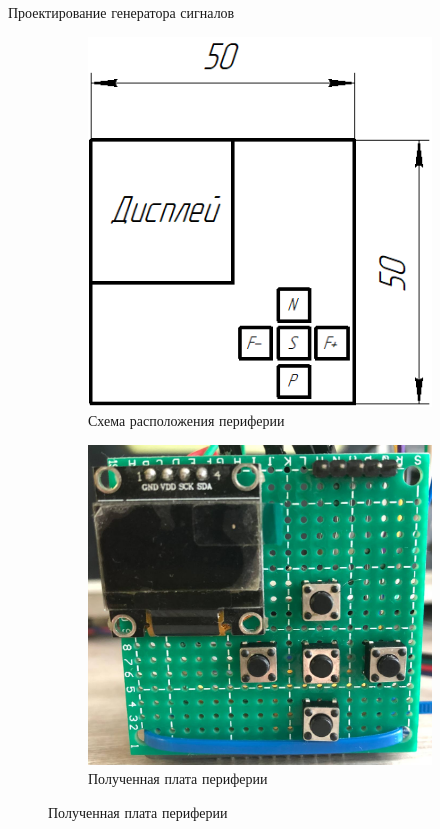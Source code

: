 \documentclass[10pt]{beamer}
\begin{document}
\begin{frame}{Проектирование генератора сигналов}
\begin{figure}
     \begin{subfigure}[H]{0.45\textwidth}
         \centering
         \includegraphics[width=\textwidth]{func_gen}
         \caption*{Схема расположения периферии}
     \end{subfigure}
     \hfill
     \begin{subfigure}[H]{0.5\textwidth}
         \centering
         \includegraphics[width=\textwidth]{m1}
         \caption*{Полученная плата периферии}
     \end{subfigure}
\end{figure}
\end{frame}
\end{document}
